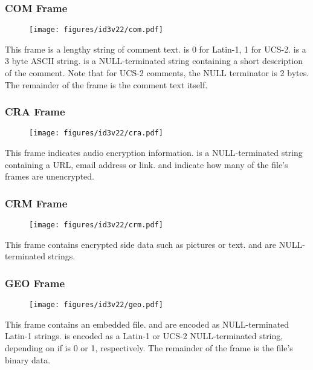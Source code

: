 \clearpage

\subsubsection{COM Frame}
\begin{figure}[h]
\texttt{[image: figures/id3v22/com.pdf]}
\end{figure}
This frame is a lengthy string of comment text.
 is 0 for Latin-1, 1 for UCS-2.
 is a 3 byte ASCII string.
 is a NULL-terminated string
containing a short description of the comment.
Note that for UCS-2 comments, the NULL terminator is 2 bytes.
The remainder of the frame is the comment text itself.

\subsubsection{CRA Frame}
\begin{figure}[h]
\texttt{[image: figures/id3v22/cra.pdf]}
\end{figure}
This frame indicates audio encryption information.
 is a NULL-terminated string
containing a URL, email address or link.
 and 
indicate how many of the file's frames are unencrypted.

\subsubsection{CRM Frame}
\begin{figure}[h]
\texttt{[image: figures/id3v22/crm.pdf]}
\end{figure}
This frame contains encrypted side data such as pictures or text.
 and  are
NULL-terminated strings.

\clearpage

\subsubsection{GEO Frame}
\begin{figure}[h]
\texttt{[image: figures/id3v22/geo.pdf]}
\end{figure}
This frame contains an embedded file.
 and  are encoded as NULL-terminated
Latin-1 strings.
 is encoded as a Latin-1 or UCS-2 NULL-terminated
string, depending on if  is 0 or 1, respectively.
The remainder of the frame is the file's binary data.

